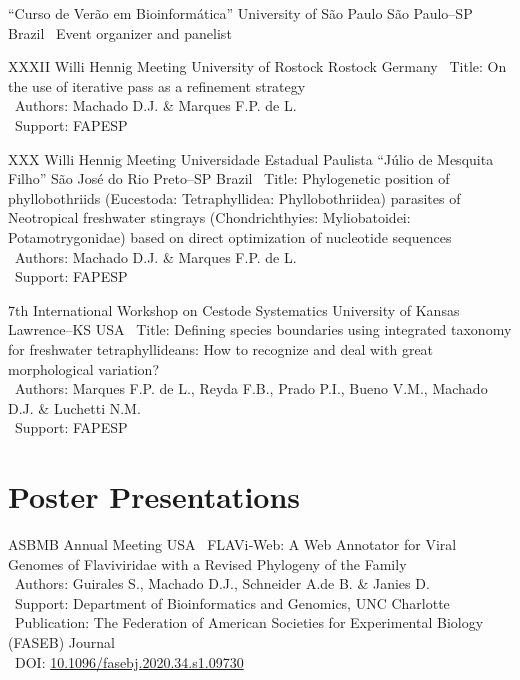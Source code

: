 \documentclass[11pt, letterpaper, sans]{moderncv}
\begin{document}
\vspace{.5em}

\cventry{---}
	{``Curso de Verão em Bioinformática''}
	{University of São Paulo}
	{São Paulo--SP}
	{Brazil}
	{
		\textbullet~Event organizer and panelist
	}

\vspace{.5em}

	{XXXII Willi Hennig Meeting}
	{University of Rostock}
	{Rostock}
	{Germany}
	{
		\textbullet~Title: On the use of iterative pass as a refinement strategy\\
		\textbullet~Authors: Machado D.J. \& Marques F.P. de L.\\
		\textbullet~Support: FAPESP
	}

\vspace{.5em}

	{XXX Willi Hennig Meeting}
	{Universidade Estadual Paulista ``Júlio de Mesquita Filho''}
	{São José do Rio Preto--SP}
	{Brazil}
	{
		\textbullet~Title: Phylogenetic position of phyllobothriids (Eucestoda: Tetraphyllidea: Phyllobothriidea) parasites of Neotropical freshwater stingrays (Chondrichthyies: Myliobatoidei: Potamotrygonidae) based on direct optimization of nucleotide sequences\\
		\textbullet~Authors: Machado D.J. \& Marques F.P. de L.\\
		\textbullet~Support: FAPESP
	}

\vspace{.5em}

\cventry{---}
	{7th International Workshop on Cestode Systematics}
	{University of Kansas}
	{Lawrence--KS}
	{USA}
	{
		\textbullet~Title: Defining species boundaries using integrated taxonomy for freshwater tetraphyllideans: How to recognize and deal with great morphological variation?\\
		\textbullet~Authors: Marques F.P. de L., Reyda F.B., Prado P.I., Bueno V.M., Machado D.J. \& Luchetti N.M.\\
		\textbullet~Support: FAPESP
	}

\clearpage


\section{Poster Presentations}

	{ASBMB Annual Meeting}
	{}
	{USA}
	{}
	{
		\textbullet~FLAVi‐Web: A Web Annotator for Viral Genomes of Flaviviridae with a Revised Phylogeny of the Family\\
		\textbullet~Authors: Guirales S.,  Machado D.J.,  Schneider A.de B. \&  Janies D.\\
		\textbullet~Support: Department of Bioinformatics and Genomics,  UNC Charlotte\\
		\textbullet~Publication: The Federation of American Societies for Experimental Biology (FASEB) Journal\\
		\textbullet~DOI: \href{https://doi.org/10.1096/fasebj.2020.34.s1.09730}{10.1096/fasebj.2020.34.s1.09730}
	}
\end{document}
